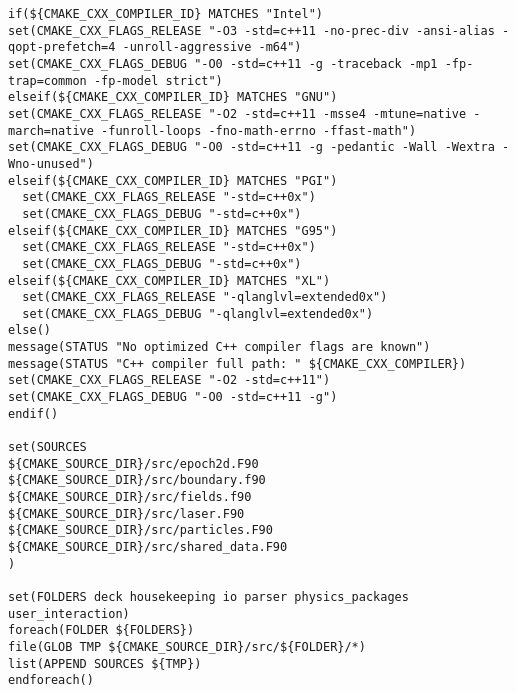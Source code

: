\begin{lstlisting}[style=FORTRAN, caption=EPOCH CMakeLists file to generate platform-specific build scripts]
if(${CMAKE_CXX_COMPILER_ID} MATCHES "Intel")
set(CMAKE_CXX_FLAGS_RELEASE "-O3 -std=c++11 -no-prec-div -ansi-alias -qopt-prefetch=4 -unroll-aggressive -m64")
set(CMAKE_CXX_FLAGS_DEBUG "-O0 -std=c++11 -g -traceback -mp1 -fp-trap=common -fp-model strict")
elseif(${CMAKE_CXX_COMPILER_ID} MATCHES "GNU")
set(CMAKE_CXX_FLAGS_RELEASE "-O2 -std=c++11 -msse4 -mtune=native -march=native -funroll-loops -fno-math-errno -ffast-math")
set(CMAKE_CXX_FLAGS_DEBUG "-O0 -std=c++11 -g -pedantic -Wall -Wextra -Wno-unused")
elseif(${CMAKE_CXX_COMPILER_ID} MATCHES "PGI")
  set(CMAKE_CXX_FLAGS_RELEASE "-std=c++0x")
  set(CMAKE_CXX_FLAGS_DEBUG "-std=c++0x")
elseif(${CMAKE_CXX_COMPILER_ID} MATCHES "G95")
  set(CMAKE_CXX_FLAGS_RELEASE "-std=c++0x")
  set(CMAKE_CXX_FLAGS_DEBUG "-std=c++0x")
elseif(${CMAKE_CXX_COMPILER_ID} MATCHES "XL")
  set(CMAKE_CXX_FLAGS_RELEASE "-qlanglvl=extended0x")
  set(CMAKE_CXX_FLAGS_DEBUG "-qlanglvl=extended0x")
else()
message(STATUS "No optimized C++ compiler flags are known")
message(STATUS "C++ compiler full path: " ${CMAKE_CXX_COMPILER})
set(CMAKE_CXX_FLAGS_RELEASE "-O2 -std=c++11")
set(CMAKE_CXX_FLAGS_DEBUG "-O0 -std=c++11 -g")
endif()

set(SOURCES
${CMAKE_SOURCE_DIR}/src/epoch2d.F90
${CMAKE_SOURCE_DIR}/src/boundary.f90
${CMAKE_SOURCE_DIR}/src/fields.f90
${CMAKE_SOURCE_DIR}/src/laser.F90
${CMAKE_SOURCE_DIR}/src/particles.F90
${CMAKE_SOURCE_DIR}/src/shared_data.F90
)

set(FOLDERS deck housekeeping io parser physics_packages user_interaction)
foreach(FOLDER ${FOLDERS})
file(GLOB TMP ${CMAKE_SOURCE_DIR}/src/${FOLDER}/*)
list(APPEND SOURCES ${TMP})
endforeach()


\end{lstlisting}
